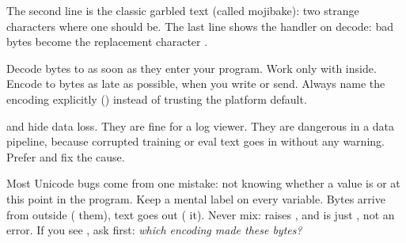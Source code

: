 The second line is the classic garbled text (called mojibake): two strange characters where one
 should be. The last line shows the  handler on decode: bad bytes become the
replacement character .

\begin{center}
\end{center}

\begin{gamerule}
Decode bytes to  as soon as they enter your program. Work only with 
inside. Encode to bytes as late as possible, when you write or send. Always name the encoding
explicitly () instead of trusting the platform default.
\end{gamerule}

\begin{trap}
 and  hide data loss. They are fine for a log
viewer. They are dangerous in a data pipeline, because corrupted training or eval text goes in
without any warning. Prefer  and fix the cause.
\end{trap}

\begin{boss}
Most Unicode bugs come from one mistake: not knowing whether a value is  or
 at this point in the program. Keep a mental label on every variable.
Bytes arrive from outside ( them), text goes out ( it). Never
mix:  raises , and  is just ,
not an error. If you see , ask first: \emph{which encoding made these
bytes?}
\end{boss}

